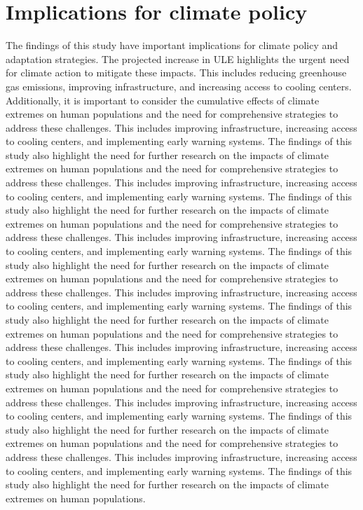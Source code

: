 \documentclass[9pt, twoside, twocolumn]{extarticle}
\begin{document}
\section*{Implications for climate policy}
The findings of this study have important implications for climate policy and adaptation strategies. The projected increase in ULE highlights the urgent need for climate action to mitigate these impacts. This includes reducing greenhouse gas emissions, improving infrastructure, and increasing access to cooling centers.\cite{IPCC2021} Additionally, it is important to consider the cumulative effects of climate extremes on human populations and the need for comprehensive strategies to address these challenges. This includes improving infrastructure, increasing access to cooling centers, and implementing early warning systems.\cite{IPCC2021} The findings of this study also highlight the need for further research on the impacts of climate extremes on human populations and the need for comprehensive strategies to address these challenges. This includes improving infrastructure, increasing access to cooling centers, and implementing early warning systems.\cite{IPCC2021} The findings of this study also highlight the need for further research on the impacts of climate extremes on human populations and the need for comprehensive strategies to address these challenges. This includes improving infrastructure, increasing access to cooling centers, and implementing early warning systems.\cite{IPCC2021} The findings of this study also highlight the need for further research on the impacts of climate extremes on human populations and the need for comprehensive strategies to address these challenges. This includes improving infrastructure, increasing access to cooling centers, and implementing early warning systems.\cite{IPCC2021} The findings of this study also highlight the need for further research on the impacts of climate extremes on human populations and the need for comprehensive strategies to address these challenges. This includes improving infrastructure, increasing access to cooling centers, and implementing early warning systems.\cite{IPCC2021} The findings of this study also highlight the need for further research on the impacts of climate extremes on human populations
and the need for comprehensive strategies to address these challenges. This includes improving infrastructure, increasing access to cooling centers, and implementing early warning systems.\cite{IPCC2021} The findings of this study also highlight the need for further research on the impacts of climate extremes on human populations and the need for comprehensive strategies to address these challenges. This includes improving infrastructure, increasing access to cooling centers, and implementing early warning systems.\cite{IPCC2021} The findings of this study also highlight the need for further research on the impacts of climate extremes on human populations.
\end{document}
